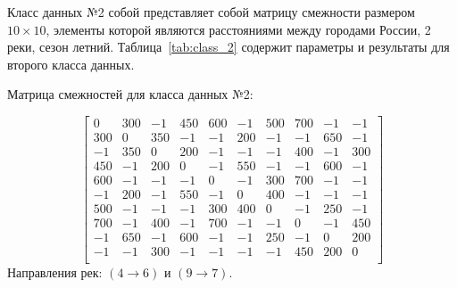\hspace{1.25cm}
Класс данных №2 собой представляет собой матрицу смежности размером $10 \times 10$, элементы которой являются расстояниями между городами России, 2 реки, сезон летний. Таблица~\ref{tab:class_2} содержит параметры и результаты для второго класса данных.

Матрица смежностей для класса данных №2:

\begin{equation*}
\begin{bmatrix}
0  &  300 & -1 &  450 & 600 & -1 &  500 & 700 & -1 &  -1 \\
300 & 0  &  350 & -1  & -1 &  200 & -1 &  -1  & 650 & -1 \\
-1 &  350 & 0  &  200 & -1 &  -1  & -1 &  400 & -1  & 300 \\
450 & -1 &  200 & 0  &  -1 &  550 & -1  & -1  & 600 & -1 \\
600 & -1 &  -1 &  -1 &  0  &  -1 &  300 & 700 & -1  & -1 \\
-1 &  200 & -1 &  550 & -1 &  0  &  400 & -1  & -1  & -1 \\
500 & -1  & -1 &  -1 &  300 & 400 & 0  &  -1  & 250 & -1 \\
700 & -1 &  400 & -1 &  700 & -1 &  -1 &  0  &  -1 &  450 \\
-1 &  650 & -1 &  600 & -1 &  -1 &  250 & -1 &  0  &  200 \\
-1 &  -1 &  300 & -1 &  -1  & -1 &  -1  & 450 & 200 & 0 \\
\end{bmatrix}
\end{equation*}
Направления рек: $(4 \to 6)$ и $(9 \to 7)$.

